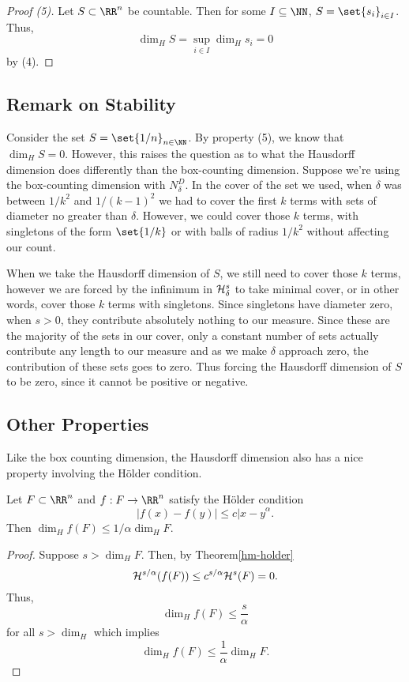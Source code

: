 \begin{proof}[Proof (5)]
	Let $S\subset\RR^n$ be countable.
	Then for some $I\subseteq\NN$, $S=\set{s_i}_{i\in I}$.
	Thus,
	\[
		\dim_H S = \sup\limits_{i\in I} \dim_H s_i = 0
	\]
	by (4).
\end{proof}

\subsection{Remark on Stability}

Consider the set $S=\set{1/n}_{n\in\NN}$.
By property (5), we know that $\dim_H S=0$.
However, this raises the question as to what the Hausdorff dimension does differently than the box-counting dimension.
Suppose we're using the box-counting dimension with $N^D_\delta$.
In the cover of the set we used, when $\delta$ was between $1/k^2$ and $1/{(k-1)}^2$ we had to cover the first $k$ terms with sets of diameter no greater than $\delta$.
However, we could cover those $k$ terms, with singletons of the form $\set{1/k}$ or with balls of radius ${1/k^2}$ without affecting our count.

When we take the Hausdorff dimension of $S$, we still need to cover those $k$ terms, however we are forced by the infinimum in $\mathcal{H}^s_\delta$ to take minimal cover, or in other words, cover those $k$ terms with singletons.
Since singletons have diameter zero, when $s>0$, they contribute absolutely nothing to our measure.
Since these are the majority of the sets in our cover, only a constant number of sets actually contribute any length to our measure and as we make $\delta$ approach zero, the contribution of these sets goes to zero.
Thus forcing the Hausdorff dimension of $S$ to be zero, since it cannot be positive or negative.

\subsection{Other Properties}

Like the box counting dimension, the Hausdorff dimension also has a nice property involving the H\"older condition.

\begin{thm}\label{hd-holder}
	Let $F\subset\RR^n$ and $f:F\rightarrow\RR^n$ satisfy the H\"older condition
	\[
		|f(x)-f(y)|\leq c{|x-y}^\alpha.
	\]
	Then $\dim_H f(F) \leq 1/\alpha \dim_H F$.
\end{thm}

\begin{proof}
	Suppose $s>\dim_H F$.
	Then, by Theorem\autoref{hm-holder}
	\[
		\mathcal{H}^{s/\alpha}(f(F))\leq c^{s/\alpha}\mathcal{H}^s(F)=0.
	\]
	Thus,
	\[
		\dim_H f(F) \leq \frac{s}{\alpha}
	\]
	for all $s > \dim_H$ which implies
	\[
		\dim_H f(F) \leq \frac{1}{\alpha}\dim_H F.
	\]
\end{proof}

